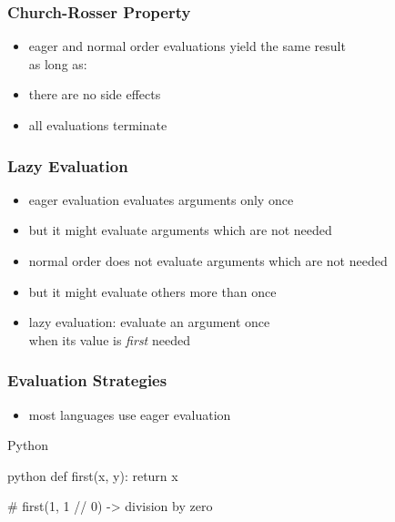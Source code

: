 \documentclass[dvipsnames]{beamer}
\theoremstyle{plain}
\begin{document}
\begin{frame}
  \frametitle{Church-Rosser Property}

  \begin{itemize}
    \item eager and normal order evaluations yield the same result\\
      as long as:

    \bigskip
    \item there are no side effects
    \item all evaluations terminate
  \end{itemize}
\end{frame}

\begin{frame}
  \frametitle{Lazy Evaluation}

  \begin{itemize}
    \item eager evaluation evaluates arguments only once
    \item but it might evaluate arguments which are not needed

    \medskip
    \item normal order does not evaluate arguments which are not needed
    \item but it might evaluate others more than once

    \pause
    \medskip
    \item \alert{lazy evaluation}: evaluate an argument once\\
      when its value is \emph{first} needed
  \end{itemize}
\end{frame}

\begin{frame}[fragile]
  \frametitle{Evaluation Strategies}

  \begin{itemize}
    \item most languages use eager evaluation
  \end{itemize}

  \begin{exampleblock}{Python}
    \begin{pygments}{python}
def first(x, y):
    return x

# first(1, 1 // 0) -> division by zero
    \end{pygments}
  \end{exampleblock}
\end{frame}
\end{document}
